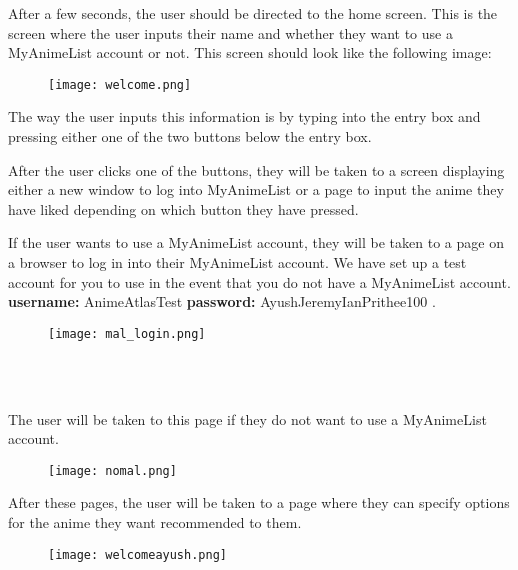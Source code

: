 \documentclass[fontsize=11pt]{article}
\begin{document}
\item[] After a few seconds, the user should be directed to the home screen. This is the screen where the user inputs their name and whether they want to use a MyAnimeList account or not. This screen should look like the following image:

\begin{figure}[htp]
    \centering
    \texttt{[image: welcome.png]}
\end{figure}

\item[] The way the user inputs this information is by typing into the entry box and pressing either one of the two buttons below the entry box.

\item After the user clicks one of the buttons, they will be taken to a screen displaying either a new window to log into MyAnimeList or a page to input the anime they have liked depending on which button they have pressed. \\

\newpage
\item[]If the user wants to use a MyAnimeList account, they will be taken to a page on a browser to log in into their MyAnimeList account. We have set up a test account for you to use in the event that you do not have a MyAnimeList account. 
\textbf{username:} AnimeAtlasTest \textbf{password:} AyushJeremyIanPrithee100 .

\begin{figure}[htp]
    \centering
    \texttt{[image: mal\_login.png]}
\end{figure}
\\
\\
\item[] The user will be taken to this page if they do not want to use a MyAnimeList account. 

\begin{figure}[htp]
    \centering
    \texttt{[image: nomal.png]}
\end{figure}


\item[]After these pages, the user will be taken to a page where they can specify options for the anime they want recommended to them.
\begin{figure}[htp]
    \centering
    \texttt{[image: welcomeayush.png]}
\end{figure}

\newpage
\end{document}

